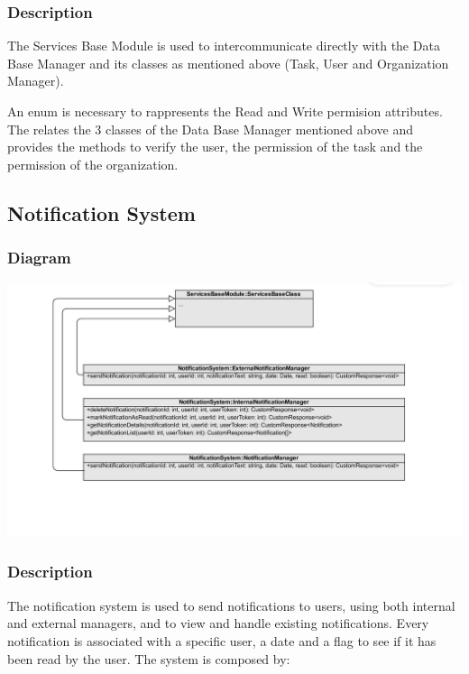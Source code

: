 \documentclass{article}
\begin{document}
\subsubsection{Description}

The Services Base Module is used to intercommunicate directly with the Data Base Manager and its classes as mentioned above (Task, User and Organization Manager).

An enum is necessary to rappresents the Read and Write permision attributes. The relates the 3 classes of the Data Base Manager mentioned above and provides the methods to verify the user, the permission of the task and the permission of the organization.

\subsection{Notification System}
\subsubsection{Diagram}

\includegraphics[width=\textwidth,height=\textheight,keepaspectratio]{images/class_diagram/notificationSystem.jpg}

\subsubsection{Description}

The notification system is used to send notifications to users, using both internal and external managers, and to view and handle existing notifications. Every notification is associated with a specific user, a date and a flag to see if it has been read by the user. The system is composed by:
\end{document}
